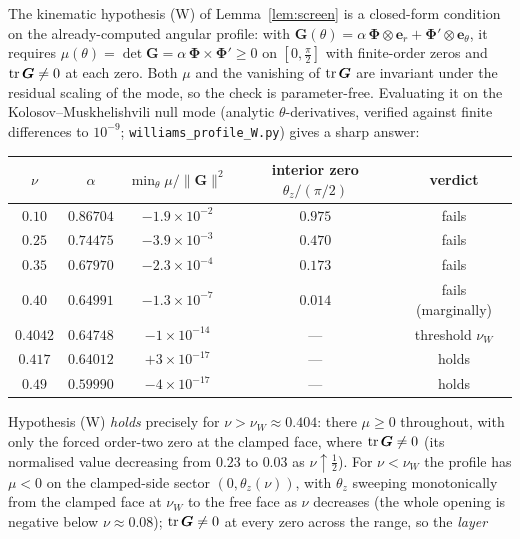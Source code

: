 The kinematic hypothesis (W) of Lemma~\ref{lem:screen} is a closed-form condition on the already-computed angular
profile: with $\bm G(\theta)=\alpha\,\bm\Phi\otimes\bm e_r+\bm\Phi'\otimes\bm e_\theta$, it requires
$\mu(\theta)=\det\bm G=\alpha\,\bm\Phi\times\bm\Phi'\ge0$ on $[0,\tfrac\pi2]$ with finite-order zeros and
$\operatorname{tr}\bm G\neq0$ at each zero. Both $\mu$ and the vanishing of $\operatorname{tr}\bm G$ are invariant under the residual scaling of
the mode, so the check is parameter-free. Evaluating it on the Kolosov--Muskhelishvili null mode (analytic
$\theta$-derivatives, verified against finite differences to $10^{-9}$; \texttt{williams\_profile\_W.py}) gives a
sharp answer:
\begin{center}
    \begin{tabular}{ccccc}
        \toprule
        $\nu$ & $\alpha$ & $\min_\theta \mu/\|\bm G\|^2$ & interior zero $\theta_z/(\pi/2)$ & verdict \\
        \midrule
        $0.10$   & $0.86704$ & $-1.9\times10^{-2}$ & $0.975$ & fails \\
        $0.25$   & $0.74475$ & $-3.9\times10^{-3}$ & $0.470$ & fails \\
        $0.35$   & $0.67970$ & $-2.3\times10^{-4}$ & $0.173$ & fails \\
        $0.40$   & $0.64991$ & $-1.3\times10^{-7}$ & $0.014$ & fails (marginally) \\
        $0.4042$ & $0.64748$ & $-1\times10^{-14}$  & ---     & threshold $\nu_W$ \\
        $0.417$  & $0.64012$ & $+3\times10^{-17}$  & ---     & holds \\
        $0.49$   & $0.59990$ & $-4\times10^{-17}$  & ---     & holds \\
        \bottomrule
    \end{tabular}
\end{center}
Hypothesis (W) \emph{holds} precisely for $\nu>\nu_W\approx0.404$: there $\mu\ge0$ throughout, with only the forced
order-two zero at the clamped face, where $\operatorname{tr}\bm G\neq0$ (its normalised value decreasing from $0.23$ to $0.03$ as
$\nu\uparrow\tfrac12$). For $\nu<\nu_W$ the profile has $\mu<0$ on the clamped-side sector $(0,\theta_z(\nu))$, with
$\theta_z$ sweeping monotonically from the clamped face at $\nu_W$ to the free face as $\nu$ decreases (the whole
opening is negative below $\nu\approx0.08$); $\operatorname{tr}\bm G\neq0$ at every zero across the range, so the \emph{layer}
